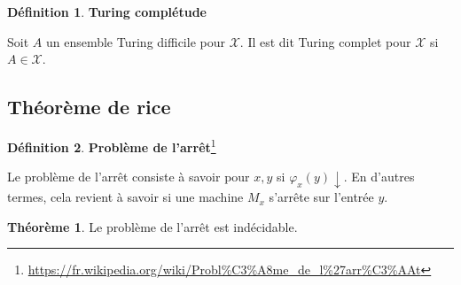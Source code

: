 \documentclass{book}
\theoremstyle{definition}
\newtheorem{theorem}{Théorème}
\newtheorem{definition}{Définition}
\numberwithin{lemma}{subsection}
\numberwithin{theorem}{subsection}
\numberwithin{definition}{subsection}
\numberwithin{proposition}{subsection}
\numberwithin{corollary}{subsection}
\numberwithin{property}{subsection}
\numberwithin{example}{subsection}
\numberwithin{heuristique}{subsection}
\numberwithin{scenario}{subsection}
\begin{document}
            \begin{definition}\textbf{Turing complétude}
                \par Soit $A$ un ensemble Turing difficile pour $\mathcal{X}$. Il est dit Turing complet pour $\mathcal{X}$ si $A \in \mathcal{X}$.
            \end{definition}
            
        \subsection{Théorème de rice}
            
            \begin{definition}\label{def:pb_arret}\textbf{Problème de l'arrêt}\footnote{\url{https://fr.wikipedia.org/wiki/Probl\%C3\%A8me\_de\_l\%27arr\%C3\%AAt}}
                \par Le problème de l'arrêt consiste à savoir pour $x, y$ si $\varphi_x(y) \downarrow$. En d'autres termes, cela revient à savoir si une machine $M_x$ s'arrête sur l'entrée $y$.
            \end{definition}
            
            \begin{theorem}
                Le problème de l'arrêt est indécidable.
            \end{theorem}
            
\end{document}
